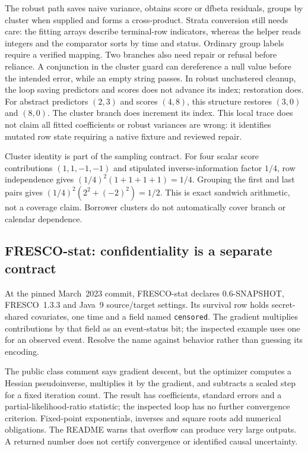 The robust path saves naive variance, obtains score or dfbeta residuals,
groups by cluster when supplied and forms a cross-product. Strata conversion
still needs care: the fitting arrays describe terminal-row indicators,
whereas the helper reads integers and the comparator sorts by time and status.
Ordinary group labels require a verified mapping. Two branches also need
repair or refusal before reliance. A conjunction in the cluster guard can
dereference a null value before the intended error, while an empty string
passes. In robust unclustered cleanup, the loop saving predictors and scores
does not advance its index; restoration does. For abstract predictors $(2,3)$
and scores $(4,8)$, this structure restores $(3,0)$ and $(8,0)$. The cluster
branch does increment its index. This local trace does not claim all fitted
coefficients or robust variances are wrong: it identifies mutated row state
requiring a native fixture and reviewed repair.
\citep{exec24_longjava_biojava,exec24_longjava_reference}

Cluster identity is part of the sampling contract. For four scalar score
contributions $(1,1,-1,-1)$ and stipulated inverse-information factor $1/4$,
row independence gives $(1/4)^2(1+1+1+1)=1/4$. Grouping the first and last
pairs gives $(1/4)^2(2^2+(-2)^2)=1/2$. This is exact sandwich arithmetic,
not a coverage claim. Borrower clusters do not automatically cover branch
or calendar dependence. \citep{exec24_longjava_reference}

\subsection{FRESCO-stat: confidentiality is a separate contract}
At the pinned March~2023 commit, FRESCO-stat declares 0.6-SNAPSHOT,
FRESCO~1.3.3 and Java~9 source/target settings. Its survival row holds
secret-shared covariates, one time and a field named \texttt{censored}.
The gradient multiplies contributions by that field as an event-status bit;
the inspected example uses one for an observed event. Resolve the name
against behavior rather than guessing its encoding.
\citep{exec24_longjava_fresco}

The public class comment says gradient descent, but the optimizer computes
a Hessian pseudoinverse, multiplies it by the gradient, and subtracts a
scaled step for a fixed iteration count. The result has coefficients,
standard errors and a partial-likelihood-ratio statistic; the inspected loop
has no further convergence criterion. Fixed-point exponentials, inverses
and square roots add numerical obligations. The README warns that overflow
can produce very large outputs. A returned number does not certify
convergence or identified causal uncertainty. \citep{exec24_longjava_fresco}

